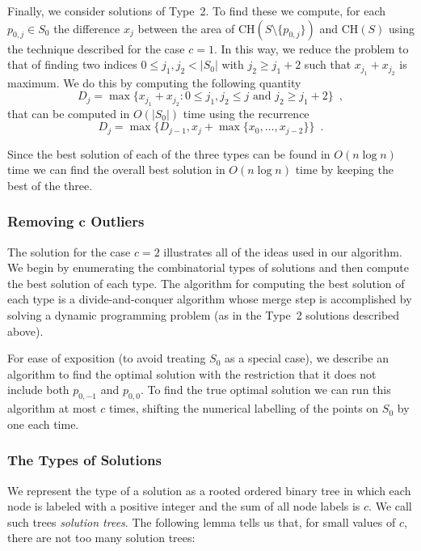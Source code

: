 \documentclass[lotsofwhite]{patmorin}
\newcommand{\ch}{\mathrm{CH}}
\begin{document}
Finally, we consider solutions of Type~2.  To find these we compute,
for each $p_{0,j}\in S_0$ the difference $x_j$ between the area of
$\ch(S\setminus\{p_{0,j}\})$ and $\ch(S)$ using the technique
described for the case $c=1$.  In this way, we reduce the problem to
that of finding two indices $0\le j_1,j_2< |S_0|$ with $j_2\ge j_1+2$
such that $x_{j_1}+x_{j_2}$ is maximum.  We do this by computing the
following quantity
\[
     D_j = \max\{x_{j_1}+x_{j_2} :
       \mbox{$0\le j_1,j_2\le j$ and $j_2 \ge j_1+2$}\} \enspace ,
\]
that can be computed in $O(|S_0|)$ time using the recurrence
\[
    D_j = \max\{D_{j-1}, x_{j} + \max\{x_{0},\ldots,x_{j-2}\}\}
                \enspace .
\]

Since the best solution of each of the three types can be found in
$O(n\log n)$ time we can find the overall best solution in $O(n\log
n)$ time by keeping the best of the three.

\subsubsection{Removing $\mathbf{c}$ Outliers}

The solution for the case $c=2$ illustrates all of the ideas used in 
our algorithm.  We begin by enumerating the combinatorial types of
solutions and then compute the best solution of each type.  The
algorithm for computing the best solution of each type is a
divide-and-conquer algorithm whose merge step is accomplished by
solving a dynamic programming problem (as in the Type~2 solutions
described above).

For ease of exposition (to avoid treating $S_0$ as a special case), we
describe an algorithm to find the optimal solution with the
restriction that it does not include both $p_{0,-1}$ and $p_{0,0}$.
To find the true optimal solution we can run this algorithm at most
$c$ times, shifting the numerical labelling of the points on $S_0$ by
one each time.

\subsubsection{The Types of Solutions}

We represent the type of a solution as a rooted ordered binary tree in
which each node is labeled with a positive integer and the sum of all
node labels is $c$.  We call such trees \emph{solution trees}.  The
following lemma tells us that, for small values of $c$, there are not
too many solution trees:
 
\end{document}
